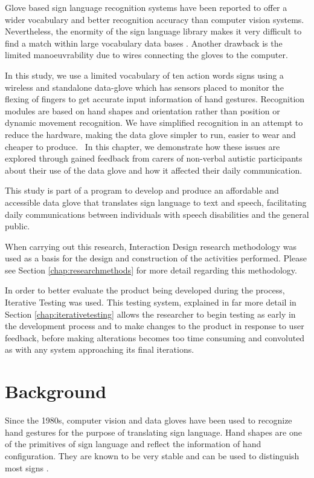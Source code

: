 Glove based sign language recognition systems have been reported to offer a wider vocabulary and better recognition accuracy than computer vision systems. Nevertheless, the enormity of the sign language library makes it very difficult to find a match within large vocabulary data bases \parencite{Premaratne2010}. Another drawback is the limited manoeuvrability due to wires connecting the gloves to the computer. 

In this study, we use a limited vocabulary of ten action words signs using a wireless and standalone data-glove which has sensors placed to monitor the flexing of fingers to get accurate input information of hand gestures. Recognition modules are based on hand shapes and orientation rather than position or dynamic movement recognition. We have simplified recognition in an attempt to reduce the hardware, making the data glove simpler to run, easier to wear and cheaper to produce. 
In this chapter, we demonstrate how these issues are explored through gained feedback from carers of non-verbal autistic participants about their use of the data glove and how it affected their daily communication. 

This study is part of a program to develop and produce an affordable and accessible data glove that translates sign language to text and speech, facilitating daily communications between individuals with speech disabilities and the general public. 

When carrying out this research, Interaction Design research methodology \parencite{Dix2004} was used as a basis for the design and construction of the activities performed. Please see Section \ref{chap:researchmethods} for more detail regarding this methodology.

In order to better evaluate the product being developed during the process, Iterative Testing \parencite{Cox2008} was used. This testing system, explained in far more detail in Section \ref{chap:iterativetesting} allows the researcher to begin testing as early in the development process and to make changes to the product in response to user feedback, before making alterations becomes too time consuming and convoluted as with any system approaching its final iterations.

\section{Background}

Since the 1980s, computer vision and data gloves have been used to recognize hand gestures for the purpose of translating sign language. Hand shapes are one of the primitives of sign language and reflect the information of hand configuration. They are known to be very stable and can be used to distinguish most signs \parencite{Fang2003}. 

